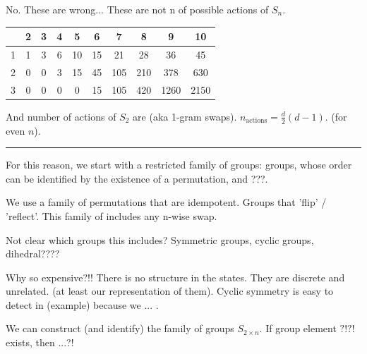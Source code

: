 No. These are wrong... These are not n of possible actions of $S_n$.

\begin{changemargin}{-3cm}{-3cm}
  \begin{center}
    \begin{tabular}{ c || c | c | c | c | c | c | c | c | c }
        & 2 & 3 & 4 & 5  & 6   & 7   & 8   & 9 & 10 \\ \hline \hline
      1 & 1 & 3 & 6 & 10 & 15  & 21  & 28  & 36   & 45\\ \hline
      2 & 0 & 0 & 3 & 15 & 45  & 105 & 210 & 378  & 630 \\ \hline
			3 & 0 & 0 & 0 & 0  & 15  & 105 & 420 & 1260 & 2150 \\
    \end{tabular}
  \end{center}
\end{changemargin}

And number of actions of $S_2$ are (aka 1-gram swaps). $n_{\text{actions}} = \frac{d}{2}(d-1)$. (for even $n$).


\begin{center}\rule{0.5\linewidth}{\linethickness}\end{center}

For this reason, we start with a restricted family of groups:
groups, whose order can be identified by the existence of a permutation, and ???.

We use a family of permutations that are idempotent. Groups that 'flip' / 'reflect'.
This family of includes any n-wise swap.

Not clear which groups this includes? Symmetric groups, cyclic groups, dihedral????

Why so expensive?!! There is no structure in the states. They are discrete and unrelated.
(at least our representation of them). Cyclic symmetry is easy to detect in (example) because
we ... .


We can construct (and identify) the family of groups $S_{2\times n}$.
If group element $?!?!$ exists, then ...?!

